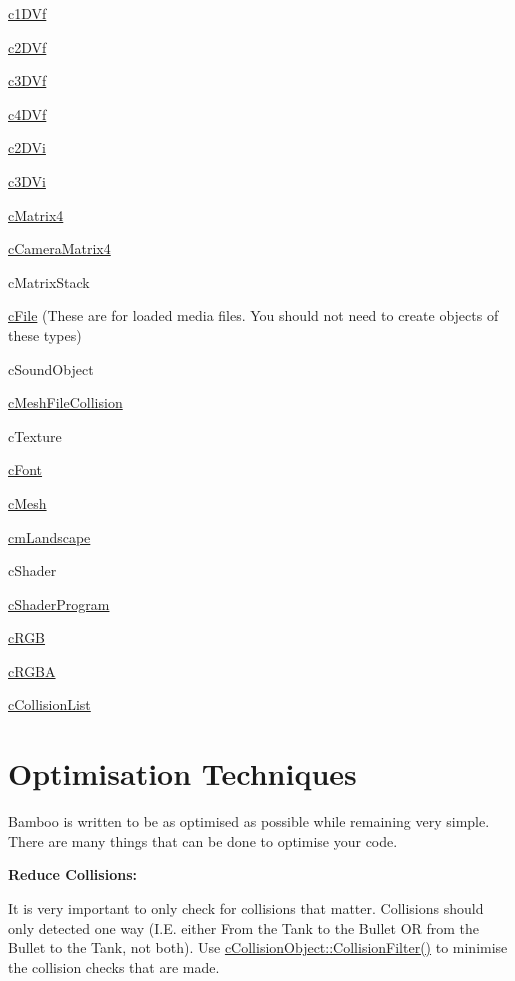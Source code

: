 \begin{DoxyItemize}
\item \hyperlink{classc1_d_vf}{c1DVf}
\item \hyperlink{classc2_d_vf}{c2DVf}
\item \hyperlink{classc3_d_vf}{c3DVf}
\item \hyperlink{classc4_d_vf}{c4DVf}
\item \hyperlink{classc2_d_vi}{c2DVi}
\item \hyperlink{classc3_d_vi}{c3DVi}
\item \hyperlink{classc_matrix4}{cMatrix4}
\item \hyperlink{classc_camera_matrix4}{cCameraMatrix4}
\item cMatrixStack
\item \hyperlink{classc_file}{cFile} (These are for loaded media files. You should not need to create objects of these types)
\begin{DoxyItemize}
\item cSoundObject
\item \hyperlink{classc_mesh_file_collision}{cMeshFileCollision}
\item cTexture
\item \hyperlink{classc_font}{cFont}
\item \hyperlink{classc_mesh}{cMesh}
\item \hyperlink{classcm_landscape}{cmLandscape}
\item cShader
\item \hyperlink{classc_shader_program}{cShaderProgram}
\end{DoxyItemize}
\item \hyperlink{classc_r_g_b}{cRGB}
\item \hyperlink{classc_r_g_b_a}{cRGBA}
\item \hyperlink{classc_collision_list}{cCollisionList}
\end{DoxyItemize}\hypertarget{_reference_lists_OptimisationTechniques}{}\section{Optimisation Techniques}\label{_reference_lists_OptimisationTechniques}
Bamboo is written to be as optimised as possible while remaining very simple. There are many things that can be done to optimise your code. \par
 {\bfseries Reduce Collisions:} \par
 It is very important to only check for collisions that matter. Collisions should only detected one way (I.E. either From the Tank to the Bullet OR from the Bullet to the Tank, not both). Use \hyperlink{classc_collision_object_a1490cdf75c8037049bfa7891aa8756b7}{cCollisionObject::CollisionFilter()} to minimise the collision checks that are made. \par
